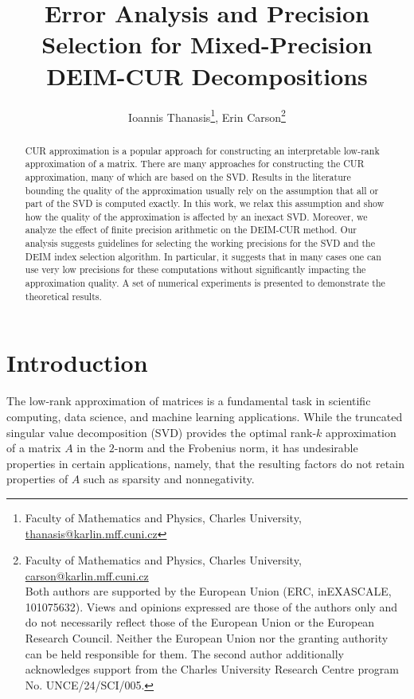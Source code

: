 \documentclass[12pt, a4paper]{article}
\theoremstyle{remark}
\begin{document}
\title{Error Analysis and Precision Selection for Mixed-Precision DEIM-CUR Decompositions}
\author{Ioannis Thanasis\thanks{Faculty of Mathematics and Physics, Charles University, \url{thanasis@karlin.mff.cuni.cz}}, Erin Carson\thanks{Faculty of Mathematics and Physics, Charles University, \url{carson@karlin.mff.cuni.cz}\\Both authors are supported by the European Union (ERC, inEXASCALE, 101075632).
Views and opinions expressed are those of the authors only and do not necessarily reflect those of the European Union or the European Research Council.
Neither the European Union nor the granting authority can be held responsible for them.
The second author additionally acknowledges support from the Charles University Research Centre program No. UNCE/24/SCI/005.}}
\date{}
\maketitle

\begin{abstract}
CUR approximation is a popular approach for constructing an interpretable low-rank approximation of a matrix. There are many approaches for constructing the CUR approximation, many of which are based on the SVD. Results in the literature bounding the quality of the approximation usually rely on the assumption that all or part of the SVD is computed exactly. In this work, we relax this assumption and show how the quality of the approximation is affected by an inexact SVD. Moreover, we analyze the effect of finite precision arithmetic on the DEIM-CUR method. Our analysis suggests guidelines for selecting the working precisions for the SVD and the DEIM index selection algorithm. In particular, it suggests that in many cases one can use very low precisions for these computations without significantly impacting the approximation quality. A set of numerical experiments is presented to demonstrate the theoretical results. 
\end{abstract}

\section{Introduction}
\label{sec:intro}

\hspace{5mm}The low-rank approximation of matrices is a fundamental task in scientific computing, data science, and machine learning applications. While the truncated singular value decomposition (SVD) provides the optimal rank-$k$ approximation of a matrix $A$ in the $2$-norm and the Frobenius norm, it has undesirable properties in certain applications, namely, that the resulting factors do not retain properties of $A$ such as sparsity and nonnegativity. 
\end{document}
